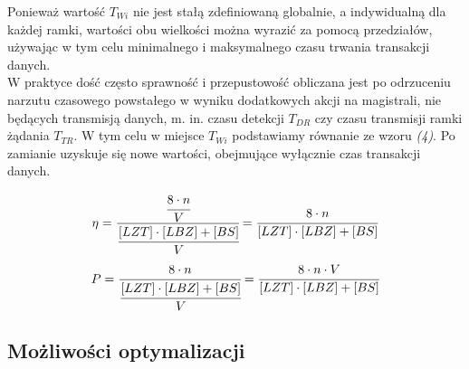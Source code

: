 \documentclass[a4paper,twoside]{article}
\begin{document}
	Ponieważ wartość $ T_{Wi} $ nie jest stałą zdefiniowaną globalnie, a indywidualną dla każdej ramki, wartości obu wielkości można wyrazić za pomocą przedziałów, używając w tym celu minimalnego i maksymalnego czasu trwania transakcji danych. \\
	W praktyce dość często sprawność i przepustowość obliczana jest po odrzuceniu narzutu czasowego powstałego w wyniku dodatkowych akcji na magistrali, nie będących transmisją danych, m. in. czasu detekcji $ T_{DR} $ czy czasu transmisji ramki żądania $ T_{TR} $. W tym celu w miejsce $ T_{Wi} $ podstawiamy równanie ze wzoru \textit{(4)}. Po zamianie uzyskuje się nowe wartości, obejmujące wyłącznie czas transakcji danych.
	
	\begin{equation}
	\eta = \cfrac{\cfrac{8\cdot n}{V}}{\cfrac{[LZT] \cdot [LBZ]+[BS]}{V}} = \cfrac{8\cdot n}{[LZT] \cdot [LBZ]+[BS]}
	\end{equation}
	\begin{equation}
	P = \cfrac{8\cdot n}{\cfrac{[LZT] \cdot [LBZ]+[BS]}{V}} = \cfrac{8\cdot n \cdot V}{[LZT] \cdot [LBZ]+[BS]}
	\end{equation}
	
		
	\subsection{Możliwości optymalizacji}
	
\end{document}
